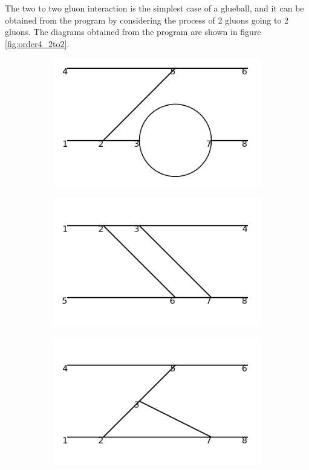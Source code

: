 \documentclass[11pt,a4paper,twoside,pdf]{article}
\numberwithin{equation}{section}
\begin{document}
The two to two gluon interaction is the simplest case of a glueball, and it can be
obtained from the program by considering the process of 2 gluons going to 2 gluons.
The diagrams obtained from the program are shown in figure \ref{fig:order4_2to2}.

\begin{figure}[h!]
    \centering
    \begin{subfigure}[t]{0.16\textwidth}
        \centering
        \includegraphics[width=\textwidth]{plots/order4_2to2/1.png}
    \end{subfigure}%
    \hfill
    \begin{subfigure}[t]{0.16\textwidth}
        \centering
        \includegraphics[width=\textwidth]{plots/order4_2to2/2.png}
    \end{subfigure}
    \hfill
    \begin{subfigure}[t]{0.16\textwidth}
        \centering
        \includegraphics[width=\textwidth]{plots/order4_2to2/3.png}

\end{subfigure}
\end{figure}
\end{document}
